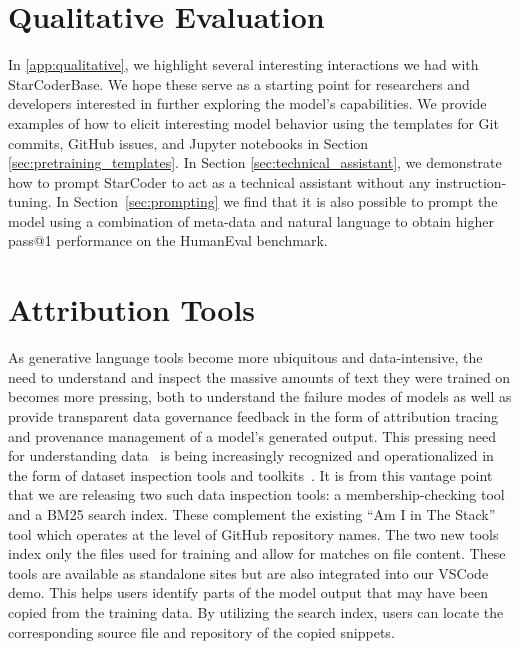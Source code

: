 \documentclass[10pt]{article} %
\begin{document}
\section{Qualitative Evaluation}
\lstset{basicstyle=\footnotesize\ttfamily}
In \autoref{app:qualitative}, we highlight several interesting interactions we had with StarCoderBase. We hope these serve as a  starting point for researchers and developers interested in further exploring the model's capabilities.
We provide examples of how to elicit interesting model behavior using the templates for Git commits, GitHub issues, and Jupyter notebooks in Section \ref{sec:pretraining_templates}. In Section \ref{sec:technical_assistant}, we demonstrate how to prompt StarCoder to act as a technical assistant without any instruction-tuning. In Section~\ref{sec:prompting} we find that it is also possible to prompt the model using a combination of meta-data and natural language to obtain higher pass@1 performance on the HumanEval benchmark.


\section{Attribution Tools}\label{sec:attribution_tool}
As generative language tools become more ubiquitous and data-intensive, the need to understand and inspect the massive amounts of text they were trained on becomes more pressing, both to understand the failure modes of models as well as provide transparent data governance feedback in the form of attribution tracing and provenance management of a model's generated output. This pressing need for understanding data~\citep{mitchell-measuring-data} is being increasingly recognized and operationalized in the form of dataset inspection tools and toolkits~\citep{akiki-spacerini-search,marone-data-portraits-search,piktus-roots-search}.
It is from this vantage point that we are releasing two such data inspection tools: a membership-checking tool and a BM25 search index.
These complement the existing ``Am I in The Stack'' tool which operates at the level of GitHub repository names. %
The two new tools index only the files used for training and allow for matches on file content.
These tools are available as standalone sites but are also integrated into our VSCode demo.
This helps users identify parts of the model output that may have been copied from the training data. By utilizing the search index, users can locate the corresponding source file and repository of the copied snippets. 
\end{document}
